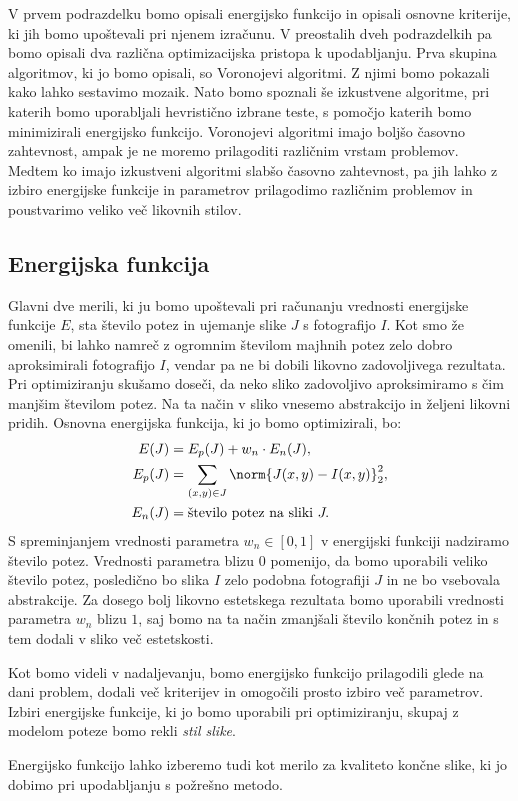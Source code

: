 %
V prvem podrazdelku bomo opisali energijsko funkcijo in opisali osnovne kriterije, ki jih bomo upoštevali pri njenem izračunu. V preostalih dveh podrazdelkih pa bomo opisali dva različna optimizacijska pristopa k upodabljanju. Prva skupina algoritmov, ki jo bomo opisali, so Voronojevi algoritmi. Z njimi bomo pokazali kako lahko sestavimo mozaik. Nato bomo spoznali še izkustvene algoritme, pri katerih bomo uporabljali hevristično izbrane teste, s pomočjo katerih bomo minimizirali energijsko funkcijo. Voronojevi algoritmi imajo boljšo časovno zahtevnost, ampak je ne moremo prilagoditi različnim vrstam problemov. Medtem ko imajo izkustveni algoritmi slabšo časovno zahtevnost, pa jih lahko z izbiro energijske funkcije in parametrov prilagodimo različnim problemov in poustvarimo veliko več likovnih stilov.
%
\subsection{Energijska funkcija}
%
Glavni dve merili, ki ju bomo upoštevali pri računanju vrednosti energijske funkcije $E$, sta število potez in ujemanje slike $J$ s fotografijo $I$. Kot smo že omenili, bi lahko namreč z ogromnim številom majhnih potez zelo dobro aproksimirali fotografijo $I$, vendar pa ne bi dobili likovno zadovoljivega rezultata. Pri optimiziranju skušamo doseči, da neko sliko zadovoljivo aproksimiramo s čim manjšim številom potez. Na ta način v sliko vnesemo abstrakcijo in željeni likovni pridih. Osnovna energijska funkcija, ki jo bomo optimizirali, bo:
%
\begin{align*}
E(J) & = E_p(J) + w_n \cdot E_n(J), \\
E_p(J) & = \sum_{(x, y) \in J} \norm{J(x, y) - I(x, y)}_2^2, \\
E_n(J) & = \textup{število potez na sliki }J.
\end{align*}
%
S spreminjanjem vrednosti parametra $w_n \in [0, 1]$ v energijski funkciji nadziramo število potez. Vrednosti parametra blizu $0$ pomenijo, da bomo uporabili veliko število potez, posledično bo slika $I$ zelo podobna fotografiji $J$ in ne bo vsebovala abstrakcije. Za dosego bolj likovno estetskega rezultata bomo uporabili vrednosti parametra $w_n$ blizu $1$, saj bomo na ta način zmanjšali število končnih potez in s tem dodali v sliko več estetskosti.

%
Kot bomo videli v nadaljevanju, bomo energijsko funkcijo prilagodili glede na dani problem, dodali več kriterijev in omogočili prosto izbiro več parametrov. Izbiri energijske funkcije, ki jo bomo uporabili pri optimiziranju, skupaj z modelom poteze bomo rekli \emph{stil slike}.
%
\begin{opomba}
Energijsko funkcijo lahko izberemo tudi kot merilo za kvaliteto končne slike, ki jo dobimo pri upodabljanju s požrešno metodo.
\end{opomba}
%
